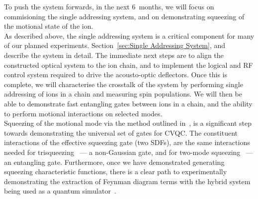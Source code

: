     To push the system forwards, in the next 6~months, we will focus on
    commisioning the single addressing system, and on demonstrating squeezing of
    the motional state of the ion.\\
    As described above, the single addressing system is a critical component for
    many of our planned experiments. Section~\ref{sec:Single Addressing System},
    and~\cite{oevergaard2024limiting} describe the system in detail. The 
    immediate next steps are to align the constructed optical system to the ion
    chain, and to implement the logical and RF control system required to drive
    the acousto-optic deflectors. Once this is complete, we will characterise
    the crosstalk of the system by performing single addressing of ions in a
    chain and measuring spin populations. We will then be able to demonstrate
    fast entangling gates between ions in a chain, and the ability to perform
    motional interactions on selected modes.\\
    Squeezing of the motional mode via the method outlined
    in~\cite{sutherland2021universal}, is a significant step towards
    demonstrating the universal set of gates for CVQC. 
    The constituent interactions of the effective squeezing gate (two SDFs), are
    the same interactions needed for trisqueezing~\cite{braunstein1987generalised, bazavan2024squeezing} --- a non-Gaussian gate, and
    for two-mode squeezing~\cite{lvovsky2015squeezed} --- an entangling gate. Furthermore, once we have
    demonstrated generating squeezing characteristic functions, there is a clear
    path to experimentally demonstrating the extraction of Feynman diagram terms
    with the hybrid system being used as a quantum
    simulator~\cite{varona2024towards}.\\
